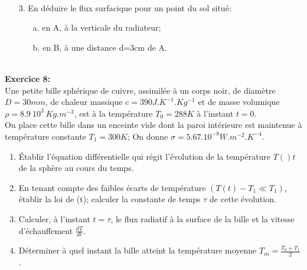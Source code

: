 \documentclass{article}
\begin{document}
\hfill
\hspace*{1.75cm}
\begin{minipage}{.35\textwidth}%
\end{minipage}%
\\
\begin{minipage}{.65\textwidth}%
\vspace*{0.4cm}
\begin{enumerate}
\item[3.] En déduire le flux surfacique pour un point du sol situé:
\begin{enumerate}
\item[a.]en A, à la verticale du radiateur;
\item[b.]en B, à une distance d=3cm de A.
\end{enumerate}
\end{enumerate}
\end{minipage}%
\hfill
\hspace*{1.58cm}
\begin{minipage}{.35\textwidth}%
\end{minipage}%
\\
\textbf{Exercice 8:}\\
Une petite bille sphérique de cuivre, assimilée à un corps noir, de diamètre $D=30mm$, de chaleur massique $c=390J.K^{-1}.Kg^{-1}$ et de masse volumique $\rho=8.9~10^{3}~Kg.m^{-3}$, est à la température $T_{0}=288K$ à l'instant $t=0$.\\
On place cette bille dans un enceinte vide dont la paroi intérieure est maintenue à température constante $T_{1}=300K$; On donne $\sigma=5.67.10^{-8}W.m^{-2}.K^{-4}$.
\begin{enumerate}
\item Établir l'équation différentielle qui régit l'évolution de la température $T()t$ de la sphère au cours du temps.
\item En tenant compte des faibles écarts de température $(T(t)-T_{1}\ll T_{1})$, établir la loi de (t); calculer la constante de temps $\tau$ de cette évolution.
\item Calculer, à l'instant $t=\tau$, le flux radiatif à la surface de la bille et la vitesse d'échauffement $\frac{dT}{dt}$.
\item Déterminer à quel instant la bille atteint la température moyenne $T_{m}=\frac{T_{0}+T_{1}}{2}$.
\end{enumerate}
\end{document}
